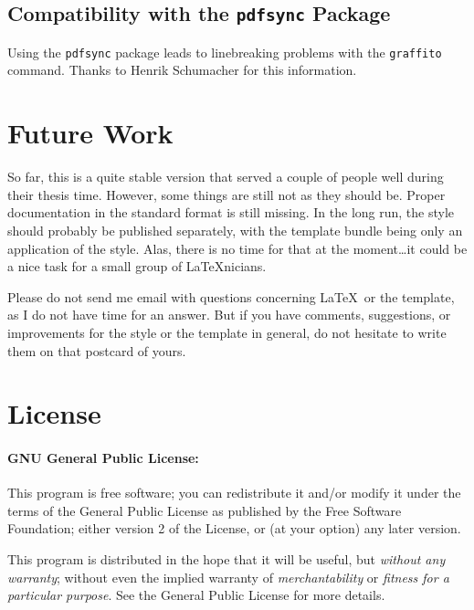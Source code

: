 \subsection*{Compatibility with the \texttt{pdfsync} Package}
Using the \texttt{pdfsync} package leads to linebreaking problems with the \texttt{graffito} command. Thanks to Henrik Schumacher for this information. 


\section{Future Work}
So far, this is a quite stable version that served a couple of people well during their thesis time. However, some things are still not as they should be. Proper documentation in the standard format is still missing. In the long run, the style should probably be published separately, with the template bundle being only an application of the style. Alas, there is no time for that at the moment\dots it could be a nice task for a small group of \LaTeX nicians.

Please do not send me email with questions concerning \LaTeX\ or the template, as I do not have time for an answer. But if you have comments, suggestions, or improvements for the style or the template in general, do not hesitate to write them on that postcard of yours.


\section{License}
\paragraph{GNU General Public License:} This program is free software; you can redistribute it and/or modify it under the terms of the  General Public License as published by the Free Software Foundation; either version 2 of the License, or (at your option) any later version.

This program is distributed in the hope that it will be useful, but \emph{without any warranty}; without even the implied warranty of \emph{merchantability} or \emph{fitness for a particular purpose}. See the  General Public License for more details.

